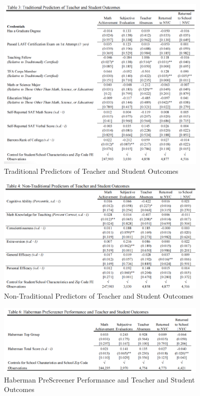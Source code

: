             \begin{figure}[H]
                \centering
                \includegraphics[width=4in]{images/ch9/9 rockoff 1.png}
                \caption{Traditional Predictors of Teacher and Student Outcomes}
            \end{figure}
            \begin{figure}[H]
                \centering
                \includegraphics[width=4in]{images/ch9/9 rockoff 2.png}
                \caption{Non-Traditional Predictors of Teacher and Student Outcomes}
            \end{figure}
            \begin{figure}[H]
                \centering
                \includegraphics[width=4in]{images/ch9/9 rockoff 3.png}
                \caption{Haberman PreScreener Performance and Teacher and Student Outcomes}
            \end{figure}
